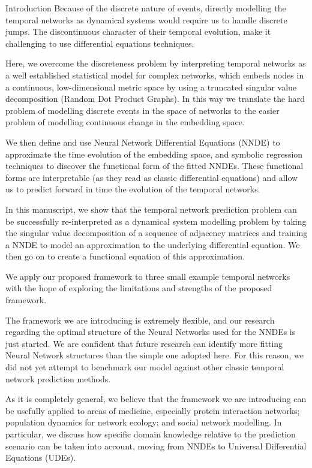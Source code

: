 \documentclass[12pt]{amsbook}
\begin{document}
\begin{chapter}{Introduction}
    Because of the discrete nature of events, directly modelling the temporal networks as dynamical systems would require us to handle discrete jumps. The discontinuous character of their temporal evolution, make it challenging to use differential equations techniques.

    Here, we overcome the discreteness problem by interpreting temporal networks as a well established statistical model for complex networks, which embeds nodes in a continuous, low-dimensional metric space by using a truncated singular value decomposition (Random Dot Product Graphs\cite{athreya2017statistical}). In this way we translate the hard problem of modelling discrete events in the space of networks to the easier problem of modelling continuous change in the embedding space. 
    
    We then define and use Neural Network Differential Equations (NNDE)\cite{SciML_C_Rak} to approximate the time evolution of the embedding space, and symbolic regression techniques to discover the functional form of the fitted NNDEs. These functional forms are interpretable (as they read as classic differential equations) and allow us to predict forward in time the evolution of the temporal networks.

    In this manuscript, we show that the temporal network prediction problem can be successfully re-interpreted as a dynamical system modelling problem by taking the singular value decomposition of a sequence of adjacency matrices and training a NNDE to model an approximation to the underlying differential equation. We then go on to create a functional equation of this approximation. 

    We apply our proposed framework to three small example temporal networks with the hope of exploring the limitations and strengths of the proposed framework. 

    The framework we are introducing is extremely flexible, and our research regarding the optimal structure of the Neural Networks used for the NNDEs is just started.
    We are confident that future research can identify more fitting Neural Network structures than the simple one adopted here.
    For this reason, we did not yet attempt to benchmark our model against other classic temporal network prediction methods.

    As it is completely general, we believe that the framework we are introducing can be usefully applied to areas of medicine, especially protein interaction networks; population dynamics for network ecology; and social network modelling. In particular, we discuss how specific domain knowledge relative to the prediction scenario can be taken into account, moving from NNDEs to Universal Differential Equations (UDEs).
\end{chapter}
\end{document}
